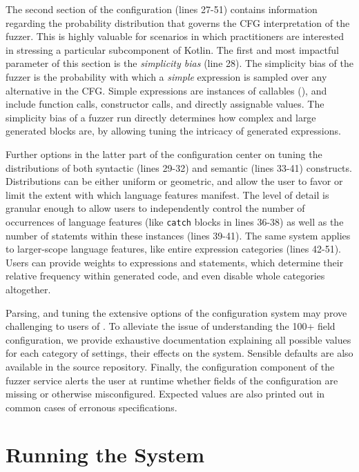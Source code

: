 The second section of the configuration (lines 27-51) contains
information regarding the probability distribution that governs the
\gls{CFG} interpretation of the fuzzer.
This is highly valuable for scenarios in which practitioners are interested
in stressing a particular subcomponent of Kotlin.
The first and most impactful parameter of this section
is the \textit{simplicity bias} (line 28).
The simplicity bias of the fuzzer is the probability
with which a \textit{simple} expression is sampled over
any alternative in the \gls{CFG}.
Simple expressions are instances of callables (),
and include function calls, constructor calls, and directly assignable values.
The simplicity bias of a fuzzer run directly determines how
complex and large generated blocks are, by allowing tuning
the intricacy of generated expressions.

Further options in the latter part of the configuration
center on tuning the distributions of both
syntactic (lines 29-32) and semantic (lines 33-41) constructs.
Distributions can be either uniform or
geometric, and allow the user to favor or limit the extent with which
language features manifest.
The level of detail is granular enough to allow users to independently
control the number of occurrences of language features (like \texttt{catch} blocks
in lines 36-38) as well as the number of statemts within these
instances (lines 39-41).
The same system applies to larger-scope language features, like
entire expression categories (lines 42-51).
Users can provide weights to expressions and statements,
which determine their relative frequency within generated code,
and even disable whole categories altogether.

Parsing, and tuning the extensive options of
the configuration system may prove challenging to users of \kf.
To alleviate the issue of understanding the 100+ field configuration,
we provide exhaustive documentation explaining all possible values
for each category of settings, their effects on the system.
Sensible defaults are also available in the source repository.
Finally, the configuration component of the fuzzer service
alerts the user at runtime whether fields of the
configuration are missing or otherwise misconfigured.
Expected values are also printed out in common cases of erronous specifications.

\section{\label{sec:runtime}Running the System}

